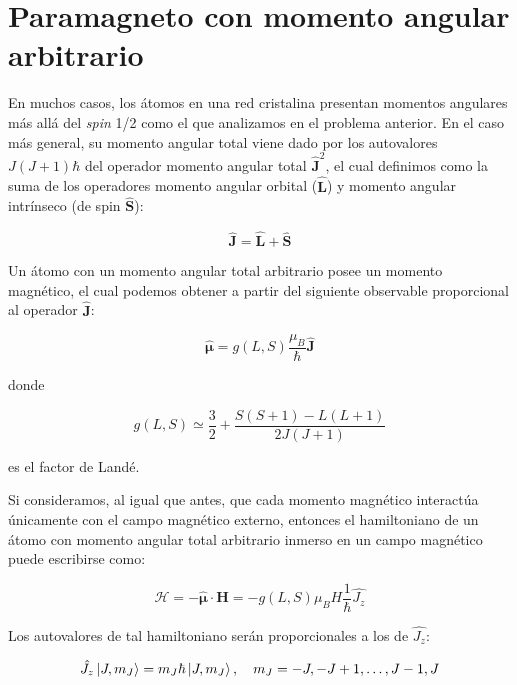 \documentclass[a4paper,11pt]{article}
\begin{document}
\section{Paramagneto con momento angular arbitrario}

En muchos casos, los átomos en una red cristalina presentan momentos
angulares más allá del \emph{spin} 1/2 como el que analizamos en el
problema anterior. En el caso más general, su momento angular total
viene dado por los autovalores $J(J+1)\hbar$ del operador momento
angular total $\hat{\textbf{J}}^2$, el cual definimos como la suma de los
operadores momento angular orbital ($\hat{\textbf{L}}$) y momento
angular intrínseco (de spin $\hat{\textbf{S}}$):

$$ \hat{\textbf{J}} = \hat{\textbf{L}} + \hat{\textbf{S}} $$

Un átomo con un momento angular total arbitrario posee un momento
magnético, el cual podemos obtener a partir del siguiente observable
proporcional al operador $\hat{\textbf{J}}$:

$$ \hat{\boldsymbol{\mu}} =
g(L, S) \frac{\mu_B}{\hbar} \hat{\textbf{J}} $$

\noindent donde

$$ g(L,S) \simeq \frac{3}{2} + \frac{S(S+1) - L(L+1)}{2J(J+1)} $$

\noindent es el factor de Landé.

Si consideramos, al igual que antes, que cada momento magnético
interactúa únicamente con el campo magnético externo, entonces el
hamiltoniano de un átomo con momento angular total arbitrario inmerso en un
campo magnético puede escribirse como:

$$ \hat{\mathcal{H}} = - \hat{\boldsymbol{\mu}} \cdot \textbf{H} =
- g(L, S) \mu_B H \frac{1}{\hbar}\hat{J_z} $$

Los autovalores de tal hamiltoniano serán proporcionales a los de
$\hat{J_z}$:

$$ \hat{J_z} \Ket{J, m_J} = m_J \hbar \Ket{J, m_J}, \quad
m_J = -J, -J + 1, \dots, J - 1, J $$
\end{document}
